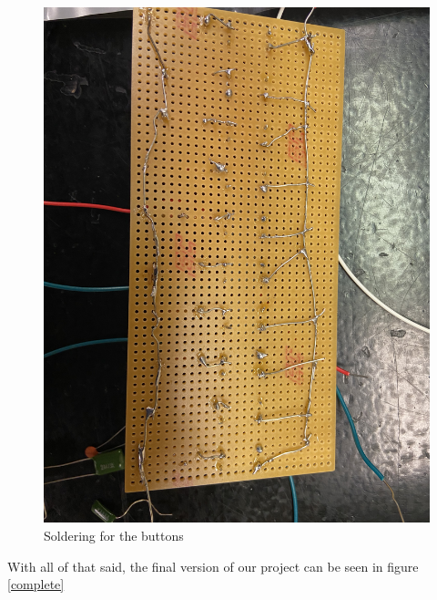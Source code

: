 \documentclass[12pt]{article}
\begin{document}
\begin{figure}[h!]
    \centering
    \includegraphics[scale=0.1]{botbuttons.jpg}
    \caption{Soldering for the buttons}
    \label{botbuttons}
\end{figure}
\newpage
With all of that said, the final version of our project can be seen in figure \ref{complete}
\end{document}
